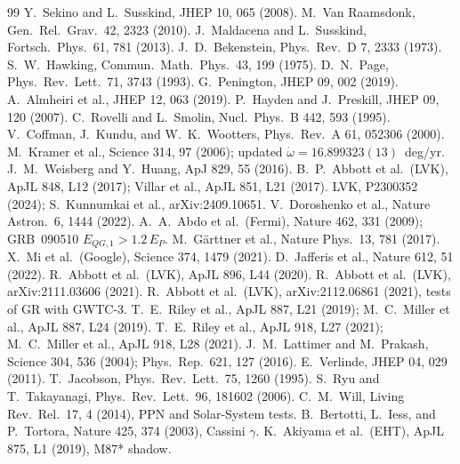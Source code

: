 \documentclass[11pt]{article}
\begin{document}
\begin{thebibliography}{99}
 Y.~Sekino and L.~Susskind, JHEP 10, 065 (2008).
 M.~Van Raamsdonk, Gen.\ Rel.\ Grav.\ 42, 2323 (2010).
 J.~Maldacena and L.~Susskind, Fortsch.\ Phys.\ 61, 781 (2013).
 J.~D.~Bekenstein, Phys.\ Rev.\ D 7, 2333 (1973).
 S.~W.~Hawking, Commun.\ Math.\ Phys.\ 43, 199 (1975).
 D.~N.~Page, Phys.\ Rev.\ Lett.\ 71, 3743 (1993).
 G.~Penington, JHEP 09, 002 (2019).
 A.~Almheiri et al., JHEP 12, 063 (2019).
 P.~Hayden and J.~Preskill, JHEP 09, 120 (2007).
 C.~Rovelli and L.~Smolin, Nucl.\ Phys.\ B 442, 593 (1995).
 V.~Coffman, J.~Kundu, and W.~K.~Wootters, Phys.\ Rev.\ A 61, 052306 (2000).
 M.~Kramer et al., Science 314, 97 (2006); updated $\dot\omega = 16.899323(13)$~deg/yr.
 J.~M.~Weisberg and Y.~Huang, ApJ 829, 55 (2016).
 B.~P.~Abbott et al.\ (LVK), ApJL 848, L12 (2017); Villar et al., ApJL 851, L21 (2017).
 LVK, P2300352 (2024); S.~Kunnumkai et al., arXiv:2409.10651.
 V.~Doroshenko et al., Nature Astron.\ 6, 1444 (2022).
 A.~A.~Abdo et al.\ (Fermi), Nature 462, 331 (2009); GRB~090510 $E_{QG,1} > 1.2\,E_P$.
 M.~G\"arttner et al., Nature Phys.\ 13, 781 (2017).
 X.~Mi et al.\ (Google), Science 374, 1479 (2021).
 D.~Jafferis et al., Nature 612, 51 (2022).
 R.~Abbott et al.\ (LVK), ApJL 896, L44 (2020).
 R.~Abbott et al.\ (LVK), arXiv:2111.03606 (2021).
 R.~Abbott et al.\ (LVK), arXiv:2112.06861 (2021), tests of GR with GWTC-3.
 T.~E.~Riley et al., ApJL 887, L21 (2019); M.~C.~Miller et al., ApJL 887, L24 (2019).
 T.~E.~Riley et al., ApJL 918, L27 (2021); M.~C.~Miller et al., ApJL 918, L28 (2021).
 J.~M.~Lattimer and M.~Prakash, Science 304, 536 (2004); Phys.\ Rep.\ 621, 127 (2016).
 E.~Verlinde, JHEP 04, 029 (2011).
 T.~Jacobson, Phys.\ Rev.\ Lett.\ 75, 1260 (1995).
 S.~Ryu and T.~Takayanagi, Phys.\ Rev.\ Lett.\ 96, 181602 (2006).
 C.~M.~Will, Living Rev.\ Rel.\ 17, 4 (2014), PPN and Solar-System tests.
 B.~Bertotti, L.~Iess, and P.~Tortora, Nature 425, 374 (2003), Cassini $\gamma$.
 K.~Akiyama et al.\ (EHT), ApJL 875, L1 (2019), M87* shadow.

\end{thebibliography}
\end{document}
